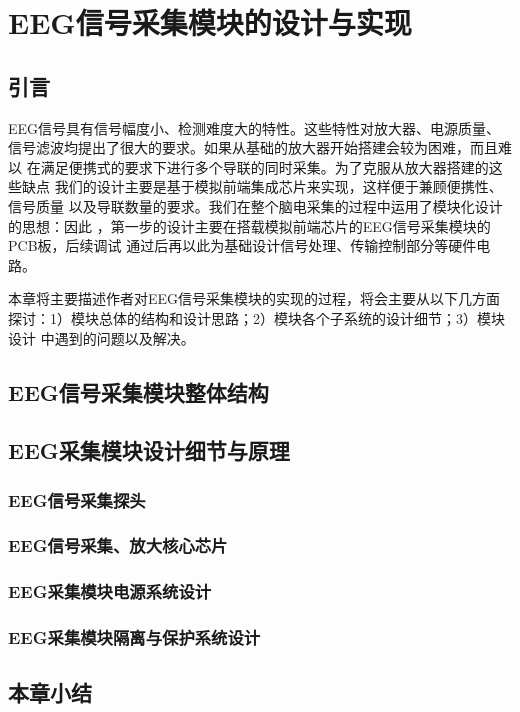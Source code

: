 \chapter{EEG信号采集模块的设计与实现}

    \section{引言}
        EEG信号具有信号幅度小、检测难度大的特性。这些特性对放大器、电源质量、
        信号滤波均提出了很大的要求。如果从基础的放大器开始搭建会较为困难，而且难以
        在满足便携式的要求下进行多个导联的同时采集。为了克服从放大器搭建的这些缺点
        我们的设计主要是基于模拟前端集成芯片来实现，这样便于兼顾便携性、信号质量
        以及导联数量的要求。我们在整个脑电采集的过程中运用了模块化设计的思想：因此
        ，第一步的设计主要在搭载模拟前端芯片的EEG信号采集模块的PCB板，后续调试
        通过后再以此为基础设计信号处理、传输控制部分等硬件电路。\par
        \vspace{1 ex}
        本章将主要描述作者对EEG信号采集模块的实现的过程，将会主要从以下几方面
        探讨：1）模块总体的结构和设计思路；2）模块各个子系统的设计细节；3）模块设计
        中遇到的问题以及解决。\par

        

        

    \section{EEG信号采集模块整体结构}

    \section{EEG采集模块设计细节与原理}

        \subsection{EEG信号采集探头}

        \subsection{EEG信号采集、放大核心芯片}

        \subsection{EEG采集模块电源系统设计}

        \subsection{EEG采集模块隔离与保护系统设计}

    \section{本章小结}

